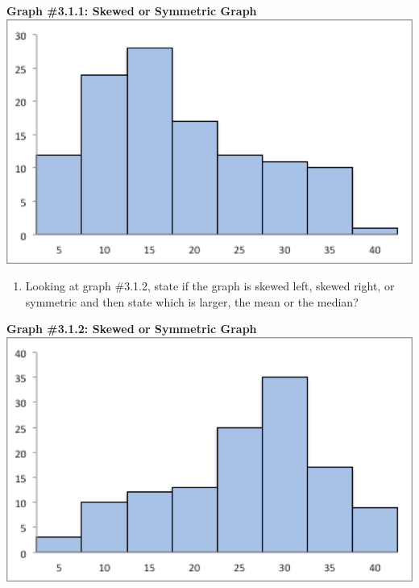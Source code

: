 \documentclass[]{book}
\providecommand{\tightlist}{%
  \setlength{\itemsep}{0pt}\setlength{\parskip}{0pt}}
\begin{document}
\textbf{Graph \#3.1.1: Skewed or Symmetric Graph}
\includegraphics{graph_3_1_1.png}

\begin{enumerate}
\def\labelenumi{\arabic{enumi}.}
\setcounter{enumi}{5}
\tightlist
\item
  Looking at graph \#3.1.2, state if the graph is skewed left, skewed right, or symmetric and then state which is larger, the mean or the median?
\end{enumerate}

\textbf{Graph \#3.1.2: Skewed or Symmetric Graph}
\includegraphics{graph_3_1_2.png}
\end{document}
